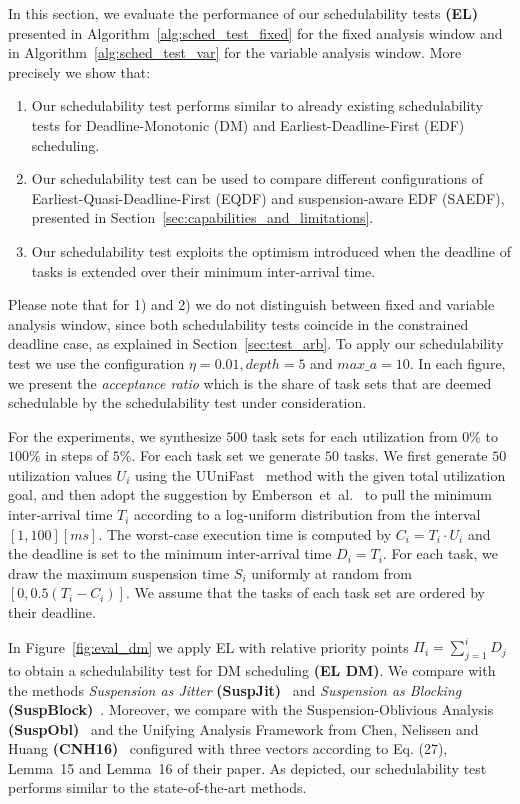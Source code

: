 \documentclass[conference]{IEEEtran}
\theoremstyle{definition}
\theoremstyle{remark}
\begin{document}
	In this section, we evaluate the performance of our schedulability tests \textbf{(EL)} presented in Algorithm~\ref{alg:sched_test_fixed} for the fixed analysis window and in Algorithm~\ref{alg:sched_test_var} for the variable analysis window.
	More precisely we show that:
	\begin{enumerate}
		\item Our schedulability test performs similar to already existing schedulability tests for Deadline-Monotonic (DM) and Earliest-Deadline-First (EDF) scheduling.
		\item Our schedulability test can be used to compare different configurations of Earliest-Quasi-Deadline-First (EQDF) and suspension-aware EDF (SAEDF), presented in Section~\ref{sec:capabilities_and_limitations}.
		\item Our schedulability test exploits the optimism introduced when the deadline of tasks is extended over their minimum inter-arrival time.
	\end{enumerate}
	Please note that for 1) and 2) we do not distinguish between fixed and variable analysis window, since both schedulability tests coincide in the constrained deadline case, as explained in  Section~\ref{sec:test_arb}.
	To apply our schedulability test we use the configuration $\eta=0.01, depth=5$ and $max\_a=10$.
	In each figure, we present the \emph{acceptance ratio} which is the share of task sets that are deemed schedulable by the schedulability test under consideration.
	
	For the experiments, we synthesize $500$ task sets for each utilization from $0\%$ to $100\%$ in steps of $5\%$.
	For each task set we generate $50$ tasks.
	We first generate $50$ utilization values $U_i$ using the UUniFast~\cite{DBLP:journals/rts/BiniB05} method with the given total utilization goal, and then adopt the suggestion by Emberson~et~al.~\cite{emberson2010techniques} to pull the minimum inter-arrival time $T_i$ according to a log-uniform distribution from the interval $[1,100] [ms]$.
	The worst-case execution time is computed by $C_i = T_i \cdot U_i$ and the deadline is set to the minimum inter-arrival time $D_i = T_i$.
	For each task, we draw the maximum suspension time $S_i$ uniformly at random from $[0,0.5(T_i-C_i)]$.
	We assume that the tasks of each task set are ordered by their deadline.
	
	In Figure~\ref{fig:eval_dm} we apply EL with relative priority points $\Pi_i = \sum_{j=1}^i D_j$ to obtain a schedulability test for DM scheduling \textbf{(EL DM)}.
	We compare with the methods \emph{Suspension as Jitter} \textbf{(SuspJit)}~\cite[Page~163]{suspension-review-jj} and \emph{Suspension as Blocking} \textbf{(SuspBlock)}~\cite[Page~165]{suspension-review-jj}.
	Moreover, we compare with the Suspension-Oblivious Analysis \textbf{(SuspObl)}~\cite[Page~162]{suspension-review-jj} and the Unifying Analysis Framework from Chen, Nelissen and Huang \textbf{(CNH16)}~\cite{ChenECRTS2016-suspension} configured with three vectors according to Eq. (27), Lemma~15 and Lemma~16 of their paper.
	As depicted, our schedulability test performs similar to the state-of-the-art methods.
	
\end{document}
